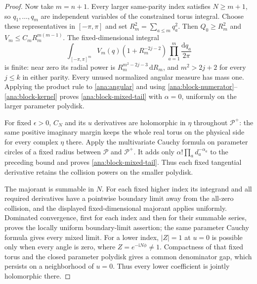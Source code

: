 \documentclass[11pt]{article}
\numberwithin{equation}{section}
\theoremstyle{definition}
\begin{document}
\begin{proof}
Now take $m=n+1$.  Every larger same-parity index satisfies
$N\ge m+1$, so $q_1,\ldots,q_m$ are independent variables of
the constrained torus integral.  Choose these representatives in
$[-\pi,\pi]$ and set $R_m^2=\sum_{a\le m}q_a^2$.
Then $Q_0\ge R_m^2$ and
$V_m\le C_mR_m^{m(m-1)}$.  The fixed-dimensional integral
\[
 \int_{[-\pi,\pi]^m} V_m(q)(1+R_m^{-2j-2})
                        \prod_{a=1}^m\frac{\mathrm dq_a}{2\pi}
\]
is finite: near zero its radial power is
$R_m^{m^2-2j-3}\,\mathrm dR_m$, and
$m^2>2j+2$ for every $j\le k$ in either parity.
Every unused normalized angular measure has mass one.
Applying the product rule to \eqref{ana:angular} and using
\eqref{ana:block-numerator}--\eqref{ana:block-kernel} proves
\eqref{ana:block-mixed-tail} with $\alpha=0$, uniformly on the
larger parameter polydisk.

For fixed $\epsilon>0$, $C_N$ and its $u$ derivatives are
holomorphic in $\eta$ throughout $\mathcal P^+$: the same
positive imaginary margin keeps the whole real torus on the physical
side for every complex $\eta$ there.  Apply the multivariate Cauchy
formula on parameter circles of a fixed radius between
$\mathcal P$ and $\mathcal P^+$.  It adds only
$\alpha!\prod_a d_a^{-\alpha_a}$ to the preceding bound and
proves \eqref{ana:block-mixed-tail}. Thus each fixed tangential
derivative retains the collision powers on the smaller polydisk.

The majorant is summable in $N$.  For each fixed higher index its
integrand and all required derivatives have a pointwise boundary
limit away from the all-zero collision, and the displayed
fixed-dimensional majorant applies uniformly.  Dominated convergence,
first for each index and then for their summable series, proves the
locally uniform boundary-limit assertion; the same parameter Cauchy
formula gives every mixed limit.  For a lower index, $|Z|=1$ at
$u=0$ is possible only when every angle is zero, where
$Z=e^{-\mathrm iN\phi}\ne1$.  Compactness of that fixed torus
and the closed parameter polydisk gives a common denominator gap,
which persists on a neighborhood of $u=0$.  Thus every lower
coefficient is jointly holomorphic there.
\end{proof}
\end{document}
